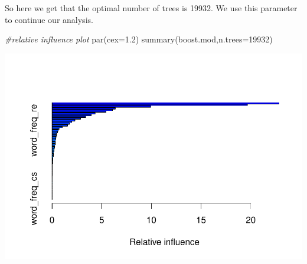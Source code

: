 \documentclass[
  11pt,
]{article}
\newenvironment{Shaded}{\begin{snugshade}}{\end{snugshade}}
\newcommand{\AttributeTok}[1]{\textcolor[rgb]{0.77,0.63,0.00}{#1}}
\newcommand{\CommentTok}[1]{\textcolor[rgb]{0.56,0.35,0.01}{\textit{#1}}}
\newcommand{\DecValTok}[1]{\textcolor[rgb]{0.00,0.00,0.81}{#1}}
\newcommand{\FloatTok}[1]{\textcolor[rgb]{0.00,0.00,0.81}{#1}}
\newcommand{\FunctionTok}[1]{\textcolor[rgb]{0.00,0.00,0.00}{#1}}
\newcommand{\NormalTok}[1]{#1}
\begin{document}
So here we get that the optimal number of trees is 19932. We use this parameter to continue our analysis.

\begin{Shaded}
\begin{Highlighting}[]
\CommentTok{\#relative influence plot}
\FunctionTok{par}\NormalTok{(}\AttributeTok{cex=}\FloatTok{1.2}\NormalTok{)}
\FunctionTok{summary}\NormalTok{(boost.mod,}\AttributeTok{n.trees=}\DecValTok{19932}\NormalTok{)}
\end{Highlighting}
\end{Shaded}

\includegraphics{report_files/figure-latex/Task_2_24-1.pdf}
\end{document}
